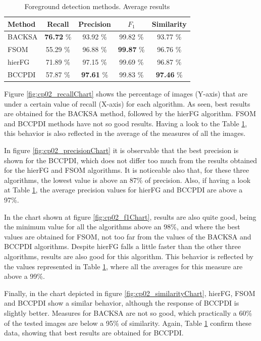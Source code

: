 \begin{table}[t]
\begin{center}
\caption{Foreground detection methods. Average results}\label{table:fgAverage}
\resizebox{0.5\columnwidth}{!} {
\begin{tabular}{|l|c|c|c|c|}
\hline
Method & Recall & Precision & $F_1$ & Similarity \\
\hline
BACKSA & \textbf{76.72} \% & 93.92 \% & 99.82 \% & 93.77 \% \\
FSOM & 55.29 \% & 96.88 \% & \textbf{99.87} \% & 96.76 \% \\
hierFG & 71.89 \% & 97.15 \% & 99.69 \% & 96.87 \% \\
BCCPDI & 57.87 \% & \textbf{97.61} \% & 99.83 \% & \textbf{97.46} \% \\
\hline
\end{tabular}
}
\end{center}
\end{table}

Figure \ref{fig:cp02_recallChart} shows the percentage of images (Y-axis) that are under a certain value of recall (X-axis) 
for each algorithm. As seen, best results are obtained for the BACKSA method, followed by the hierFG algorithm.  FSOM 
and BCCPDI methods have not so good results. Having a look to the Table \ref{table:fgAverage}, this behavior is also 
reflected in the average of the measures of all the images.

In figure \ref{fig:cp02_precisionChart} it is observable that the best precision is shown for the BCCPDI, which does not 
differ too much from the results obtained for the hierFG and FSOM algorithms. It is noticeable also that, for these 
three algorithms, the lowest value is above an 87\% of precision. Also, if having a look at Table \ref{table:fgAverage}, 
the average precision values for hierFG and BCCPDI are above a 97\%.

In the chart shown at figure \ref{fig:cp02_f1Chart}, results are also quite good, being the minimum value for all the 
algorithms above an 98\%, and where the best values are obtained for FSOM, not too far from the values of the BACKSA and 
BCCPDI algorithms. Despite hierFG falls a little faster than the other three algorithms, results are also good for this 
algorithm. This behavior is reflected by the values represented in Table \ref{table:fgAverage}, where all the averages 
for this measure are above a 99\%.

Finally, in the chart depicted in figure \ref{fig:cp02_similarityChart}, hierFG, FSOM and BCCPDI show a similar behavior, 
although the response of BCCPDI is slightly better. Measures for BACKSA are not so good, which practically a 60\% of the 
tested images are below a 95\% of similarity. Again, Table \ref{table:fgAverage} confirm these data, showing that best 
results are obtained for BCCPDI.


